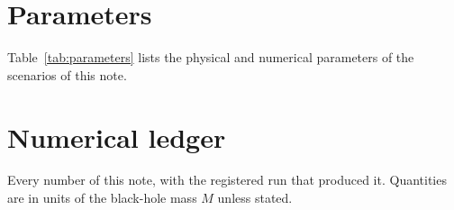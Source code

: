\documentclass[aps,prd,twocolumn,10pt,superscriptaddress,nofootinbib,longbibliography,floatfix]{revtex4-2}
\begin{document}
\appendix

\section{Parameters}\label{app:parameters}

Table~\ref{tab:parameters} lists the physical and numerical parameters of the scenarios of this note.



\section{Numerical ledger}\label{app:ledger}

Every number of this note, with the registered run that produced it. Quantities are in units of the black-hole mass $M$ unless stated.




\end{document}
